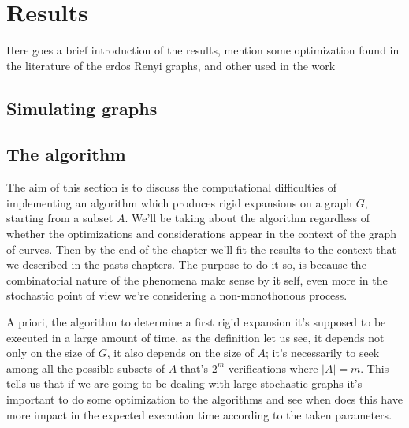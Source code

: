 
\chapter{Results} %

\label{Chapter3} %



{\color{Blue} Here goes a brief introduction of the results, mention some optimization found in the literature of the erdos Renyi graphs, and other used in the work}

\section{Simulating graphs}



\section{The algorithm}
The aim of this section is to discuss the computational difficulties of implementing an algorithm which produces rigid expansions on a graph $G$, starting from a subset $A$. We'll be taking about the algorithm regardless of whether the optimizations and considerations appear in the context of the graph of curves. Then by the end of the chapter we'll fit the results to the context that we described in the pasts chapters. The purpose to do it so, is because the combinatorial nature of the phenomena make sense by it self, even more in the stochastic point of view we're considering a non-monothonous process.

A priori, the algorithm to determine a first rigid expansion it's supposed to be executed in a large amount of time, as the definition let us see, it depends not only on the size of $G$, it also depends on the size of $A$; it's necessarily to seek among all the possible subsets of $A$ that's $2^{m}$ verifications where $|A| = m$. This tells us that if we are going to be dealing with large stochastic graphs it's important to do some optimization to the algorithms and see when does this have more impact in the expected execution time according to the taken parameters.

